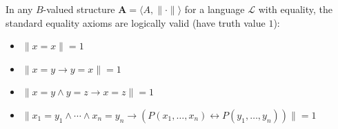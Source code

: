 In any $B$-valued structure $\mathbf{A} = \langle A, \|{\cdot}\| \rangle$ for a language $\mathcal{L}$ with equality, the standard equality axioms are logically valid (have truth value $1$):
\begin{itemize}
\item $\|x = x\| = 1$
\item $\|x = y \rightarrow y = x\| = 1$
\item $\|x = y \land y = z \rightarrow x = z\| = 1$
\item $\|x_1 = y_1 \land \cdots \land x_n = y_n \rightarrow (P(x_1, \ldots, x_n) \leftrightarrow P(y_1, \ldots, y_n))\| = 1$
\end{itemize}
